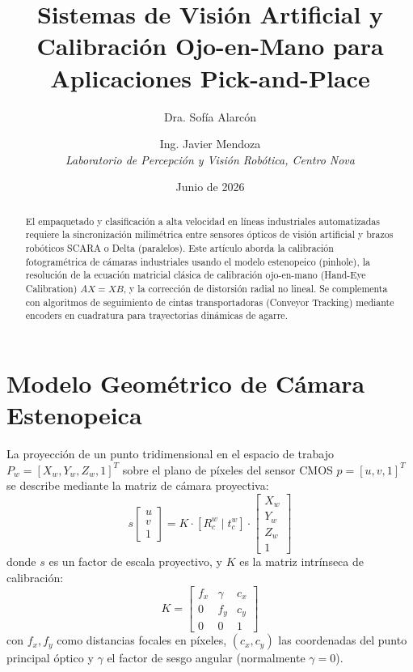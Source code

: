 \documentclass[11pt,a4paper]{article}
\title{Sistemas de Visión Artificial y Calibración Ojo-en-Mano para Aplicaciones Pick-and-Place}
\author{Dra. Sofía Alarcón \and Ing. Javier Mendoza \\
\textit{Laboratorio de Percepción y Visión Robótica, Centro Nova}}
\date{Junio de 2026}
\begin{document}
\maketitle

\begin{abstract}
El empaquetado y clasificación a alta velocidad en líneas industriales automatizadas requiere la sincronización milimétrica entre sensores ópticos de visión artificial y brazos robóticos SCARA o Delta (paralelos). Este artículo aborda la calibración fotogramétrica de cámaras industriales usando el modelo estenopeico (pinhole), la resolución de la ecuación matricial clásica de calibración ojo-en-mano (Hand-Eye Calibration) $AX = XB$, y la corrección de distorsión radial no lineal. Se complementa con algoritmos de seguimiento de cintas transportadoras (Conveyor Tracking) mediante encoders en cuadratura para trayectorias dinámicas de agarre.
\end{abstract}

\section{Modelo Geométrico de Cámara Estenopeica}
La proyección de un punto tridimensional en el espacio de trabajo $P_w = [X_w, Y_w, Z_w, 1]^T$ sobre el plano de píxeles del sensor CMOS $p = [u, v, 1]^T$ se describe mediante la matriz de cámara proyectiva:
\begin{equation}
s \begin{bmatrix} u \\ v \\ 1 \end{bmatrix} = K \cdot [R_{c}^w \mid t_{c}^w] \cdot \begin{bmatrix} X_w \\ Y_w \\ Z_w \\ 1 \end{bmatrix}
\end{equation}
donde $s$ es un factor de escala proyectivo, y $K$ es la matriz intrínseca de calibración:
\begin{equation}
K = \begin{bmatrix}
f_x & \gamma & c_x \\
0 & f_y & c_y \\
0 & 0 & 1
\end{bmatrix}
\end{equation}
con $f_x, f_y$ como distancias focales en píxeles, $(c_x, c_y)$ las coordenadas del punto principal óptico y $\gamma$ el factor de sesgo angular (normalmente $\gamma = 0$).
\end{document}
